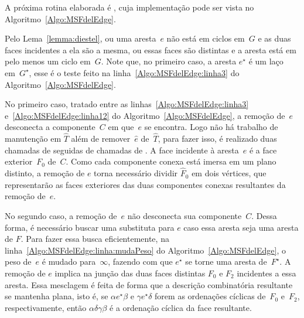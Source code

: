 A próxima rotina elaborada é \MSFdelEdge{}, cuja implementação pode ser vista no Algoritmo~\ref{Algo:MSFdelEdge}.

Pelo Lema~\ref{lemma:diestel}, ou uma aresta~$e$ não está em ciclos em~$G$ e as duas faces incidentes a ela são a mesma, ou essas faces são distintas e a aresta está em pelo menos um ciclo em~$G$.
Note que, no primeiro caso, a aresta $e^\star$ é um laço em~$G^\star$, esse é o teste feito na linha~\ref{Algo:MSFdelEdge:linha3} do Algoritmo~\ref{Algo:MSFdelEdge}.

No primeiro caso, tratado entre as linhas~\ref{Algo:MSFdelEdge:linha3} e~\ref{Algo:MSFdelEdge:linha12} do Algoritmo~\ref{Algo:MSFdelEdge}, a remoção de~$e$ desconecta a componente~$C$ em que~$e$ se encontra.
Logo não há trabalho de manutenção em $\hat T$ além de remover~$\hat e$ de~$\hat T$, para fazer isso, é realizado 
duas chamadas de \LCOCycle{} seguidas de chamadas de \LCOSplit{}.
A face incidente à aresta~$e$ é a face exterior~$F_0$ de~$C$.
Como cada componente conexa está imersa em um plano distinto, a remoção de $e$ torna necessário dividir $\hat F_0$ em dois vértices, que representarão as faces exteriores das duas componentes conexas resultantes da remoção de~$e$.

No segundo caso, a remoção de~$e$ não desconecta sua componente~$C$.
Dessa forma, é necessário buscar uma substituta para $e$ caso essa aresta seja uma aresta de $F$.
Para fazer essa busca eficientemente, na linha~\ref{Algo:MSFdelEdge:linha:mudaPeso} do Algoritmo~\ref{Algo:MSFdelEdge}, o peso de~$e$ é mudado para~$\infty$, fazendo com que $e^\star$ se torne uma aresta de~$F^\star$. 
A remoção de $e$ implica na junção das duas faces distintas $F_0$ e $F_2$ incidentes a essa aresta.
Essa mesclagem é feita de forma que a descrição combinatória resultante se mantenha plana, isto é, se $\alpha e^\star \beta$ e $\gamma e^\star \delta$ forem as ordenações cíclicas de~$F_0$ e~$F_2$, respectivamente, então $\alpha \delta\gamma\beta$ é a ordenação cíclica da face resultante.

